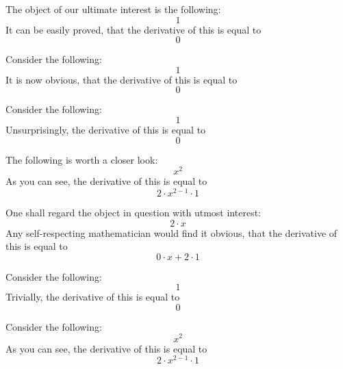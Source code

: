 \documentclass{article}
\begin{document}
The object of our ultimate interest is the following:
\begin{equation}
1 
\end{equation}
It can be easily proved, that the derivative of this is equal to
\begin{equation}
0 
\end{equation}

Consider the following:
\begin{equation}
1 
\end{equation}
It is now obvious, that the derivative of this is equal to
\begin{equation}
0 
\end{equation}

Consider the following:
\begin{equation}
1 
\end{equation}
Unsurprisingly, the derivative of this is equal to
\begin{equation}
0 
\end{equation}

The following is worth a closer look:
\begin{equation}
x ^{2 } 
\end{equation}
As you can see, the derivative of this is equal to
\begin{equation}
2 \cdot x ^{2 - 1 } \cdot 1 
\end{equation}

One shall regard the object in question with utmost interest:
\begin{equation}
2 \cdot x 
\end{equation}
Any self-respecting mathematician would find it obvious, that the derivative of this is equal to
\begin{equation}
0 \cdot x + 2 \cdot 1 
\end{equation}

Consider the following:
\begin{equation}
1 
\end{equation}
Trivially, the derivative of this is equal to
\begin{equation}
0 
\end{equation}

Consider the following:
\begin{equation}
x ^{2 } 
\end{equation}
As you can see, the derivative of this is equal to
\begin{equation}
2 \cdot x ^{2 - 1 } \cdot 1 
\end{equation}
\end{document}
